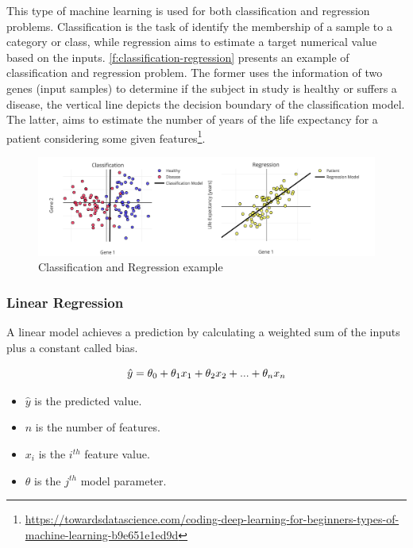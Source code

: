 This type of machine learning is used for both classification and regression problems. Classification is the task of identify the membership of a sample to a category or class, while regression aims to estimate a target numerical value based on the inputs. \autoref{f:classification-regression} presents an example of classification and regression problem. The former uses the information of two genes (input samples) to determine if the subject in study is healthy or suffers a disease, the vertical line depicts the decision boundary of the classification model. The latter, aims to estimate the number of years of the life expectancy for a patient considering some given features\footnote{\url{https://towardsdatascience.com/coding-deep-learning-for-beginners-types-of-machine-learning-b9e651e1ed9d}}. 

\begin{figure}[h]
\centering
\includegraphics[width=\linewidth]{figures/Ch2/Regression-Classification.png}
\caption{Classification and Regression example}
\label{f:classification-regression}
\end{figure}

\subsubsection{Linear Regression}
A linear model achieves a prediction by calculating a weighted sum of the inputs plus a constant called bias.

\begin{equation}
    \hat{y} = \theta_0 + \theta_1 x_1 + \theta_2 x_2 + ...+ \theta_n x_n\\
\end{equation}

\begin{itemize}
    \item \begin{math}\hat{y}\end{math} is the predicted value.
    \item \begin{math}n\end{math} is the number of features.
    \item \begin{math}x_i\end{math} is the \begin{math}i^{th}\end{math} feature value.
    \item \begin{math}\theta\end{math} is the \begin{math}j^{th}\end{math} model parameter.
\end{itemize}


